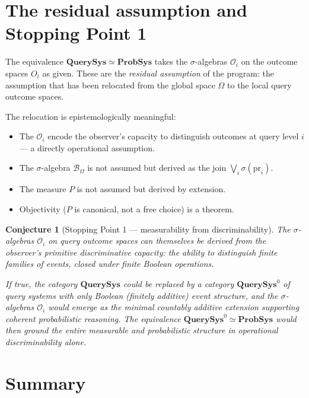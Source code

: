 \documentclass[11pt]{article}
\newtheorem{conjecture}{Conjecture}
\newcommand{\QSys}{\mathbf{QuerySys}}
\newcommand{\PSys}{\mathbf{ProbSys}}
\newcommand{\Ocal}{\mathcal{O}}
\newcommand{\Bcal}{\mathcal{B}}
\newcommand{\pr}{\mathrm{pr}}
\begin{document}
\section{The residual assumption and Stopping Point 1}
\label{sec:residual}

The equivalence $\QSys \simeq \PSys$ takes the $\sigma$-algebras $\Ocal_i$
on the outcome spaces $O_i$ as given.  These are the \emph{residual
assumption} of the program: the assumption that has been relocated from the
global space $\Omega$ to the local query outcome spaces.

The relocation is epistemologically meaningful:
\begin{itemize}
  \item The $\Ocal_i$ encode the observer's capacity to distinguish outcomes
    at query level $i$ --- a directly operational assumption.
  \item The $\sigma$-algebra $\Bcal_\Omega$ is not assumed but derived as
    the join $\bigvee_i \sigma(\pr_i)$.
  \item The measure $P$ is not assumed but derived by extension.
  \item Objectivity ($P$ is canonical, not a free choice) is a theorem.
\end{itemize}

\begin{conjecture}[Stopping Point 1 --- measurability from discriminability]
The $\sigma$-algebras $\Ocal_i$ on query outcome spaces can themselves be
derived from the observer's primitive discriminative capacity: the ability
to distinguish finite families of events, closed under finite Boolean
operations.

If true, the category $\QSys$ could be replaced by a category $\QSys^0$ of
query systems with only Boolean (finitely additive) event structure, and the
$\sigma$-algebras $\Ocal_i$ would emerge as the minimal countably additive
extension supporting coherent probabilistic reasoning.  The equivalence
$\QSys^0 \simeq \PSys$ would then ground the entire measurable and
probabilistic structure in operational discriminability alone.
\end{conjecture}

\section{Summary}
\label{sec:summary}
\end{document}

